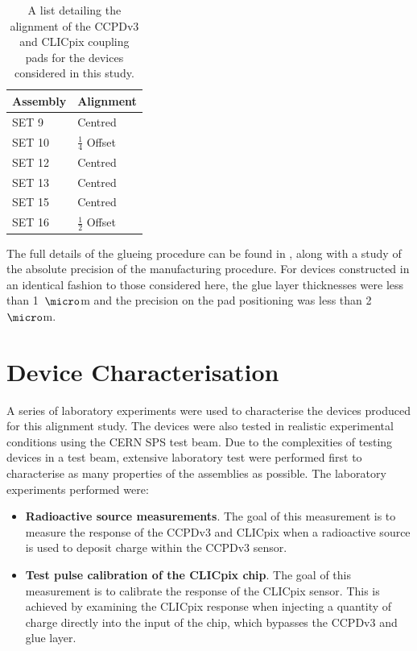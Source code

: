 \begin{table}[h!]
\centering
\begin{tabular}{ l l }
\hline
Assembly & Alignment \\ 
\hline
SET 9 & Centred \\
SET 10 & $\frac{1}{4}$ Offset \\
SET 12 & Centred \\
SET 13 & Centred \\
SET 15 & Centred \\
SET 16 & $\frac{1}{2}$ Offset \\
\hline
\end{tabular}
\caption[A list detailing the alignment of the CCPDv3 and CLICpix coupling pads for the devices considered in this study.]{A list detailing the alignment of the CCPDv3 and CLICpix coupling pads for the devices considered in this study.}
\label{table:alignment}
\end{table}

The full details of the glueing procedure can be found in \cite{FabricationNote}, along with a study of the absolute precision of the manufacturing procedure.  For devices constructed in an identical fashion to those considered here, the glue layer thicknesses were less than 1~${\micro}$m and the precision on the pad positioning was less than 2~${\micro}$m.  


\section{Device Characterisation}
A series of laboratory experiments were used to characterise the devices produced for this alignment study.  The devices were also tested in realistic experimental conditions using the CERN SPS test beam.  Due to the complexities of testing devices in a test beam, extensive laboratory test were performed first to characterise as many properties of the assemblies as possible.  The laboratory experiments performed were:

\begin{itemize}
\item \textbf{Radioactive source measurements}.  The goal of this measurement is to measure the response of the CCPDv3 and CLICpix when a radioactive source is used to deposit charge within the CCPDv3 sensor.  
\item \textbf{Test pulse calibration of the CLICpix chip}.  The goal of this measurement is to calibrate the response of the CLICpix sensor.  This is achieved by examining the CLICpix response when injecting a quantity of charge directly into the input of the chip, which bypasses the CCPDv3 and glue layer.
\end{itemize} 

